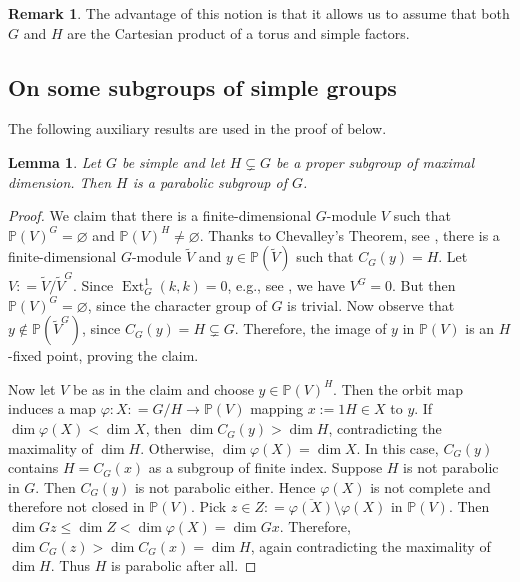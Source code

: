 \documentclass[12pt]{amsart}
\renewcommand{\phi}{\varphi}
\newcommand{\leer}{\varnothing}
\renewcommand{\tilde}{\widetilde}
\newcommand\Ext{{\operatorname{Ext}}}
\numberwithin{equation}{section}
\newtheorem{lemma}[lemma]{Lemma}
\theoremstyle{definition}
\newtheorem{remark}[remark]{Remark}
\begin{document}
\begin{remark}
  The advantage of this notion is that it allows us to assume that both
  $G$ and $H$ are the Cartesian product of a torus and simple factors.
\end{remark}

\subsection{On some subgroups of simple groups}

The following auxiliary results are used in the proof of 
below.

\begin{lemma}
  \label{lem:diag1}
  Let $G$ be simple and let $H \subsetneq G$ be a proper subgroup of
  maximal dimension. Then $H$ is a parabolic subgroup of $G$.
\end{lemma}

\begin{proof}
  We claim that there is a finite-dimensional $G$-module $V$ such that
  $\mathbb{P}(V)^G = \leer$ and $\mathbb{P}(V)^H \ne \leer$.  Thanks
  to Chevalley's Theorem, see \cite[Ch.~II, Thm.~5.1]{borel}, there is
  a finite-dimensional $G$-module $\tilde V$ and
  $y \in \mathbb{P}(\tilde V)$ such that $C_G(y) = H$.  Let
  $V: = \tilde{V}/\tilde{V}^G$.  Since $\Ext_G^1(k,k) = 0$, e.g.,
  see \cite[(2.12(1))]{jantzen}, we have $V^G = 0$. But then
  $\mathbb{P}(V)^G = \leer$, since the character group of $G$ is
  trivial. Now observe that $y \notin \mathbb{P}(\tilde V^G)$, since
  $C_G(y) = H \subsetneq G$. Therefore, the image of $y$ in
  $\mathbb{P}(V)$ is an $H$-fixed point, proving the claim.
	
  Now let $V$ be as in the claim and choose $y\in \mathbb{P}(V)^H$.
  Then the orbit map induces a map
  $\phi : X : = G/H \to \mathbb{P}(V)$ mapping $x := 1H\in X$ to $y$.
  If $\dim \phi (X) < \dim X$, then $\dim C_G(y) > \dim H$,
  contradicting the maximality of $\dim H$.  Otherwise,
  $\dim \phi (X) = \dim X$. In this case, $C_G(y)$ contains
  $H = C_G(x)$ as a subgroup of finite index. Suppose $H$ is not
  parabolic in $G$. Then $C_G(y)$ is not parabolic either. Hence
  $\phi (X)$ is not complete and therefore not closed in
  $\mathbb{P}(V)$.  Pick
  $z\in Z : = \overline {\phi(X)} \setminus \phi(X)$ in
  $\mathbb{P}(V)$.  Then
  $\dim Gz \leqslant \dim Z < \dim \phi(X) = \dim Gx$. Therefore,
  $\dim C_G(z) > \dim C_G(x) = \dim H$, again contradicting the
  maximality of $\dim H$. Thus $H$ is parabolic after all.
\end{proof}
\end{document}
